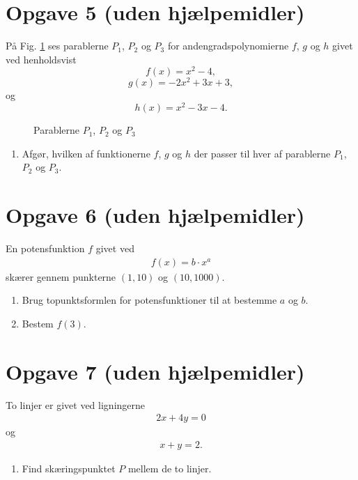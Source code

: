 \section*{Opgave 5 (uden hjælpemidler)}
På Fig. \ref{fig:polys} ses parablerne $P_1$, $P_2$ og $P_3$ for andengradspolynomierne $f$, $g$ og $h$ givet ved henholdsvist
\[
	f(x) = x^2-4,
\]
\[
	g(x) = -2x^2+3x+3,
\]
og
\[
	h(x)= x^2-3x-4.
\]
\begin{figure}[H]
\centering
	\caption{Parablerne $P_1$, $P_2$ og $P_3$}
	\label{fig:polys}
\end{figure}
\begin{enumerate}[label=\roman*)]
\item Afgør, hvilken af funktionerne $f$, $g$ og $h$ der passer til hver af parablerne $P_1$, $P_2$ og $P_3$.
\end{enumerate}

\section*{Opgave 6 (uden hjælpemidler)}
En potensfunktion $f$ givet ved
\begin{align*}
f(x) = b\cdot x^a
\end{align*} skærer gennem punkterne $(1,10)$ og $(10,1000)$.
\begin{enumerate}[label=\roman*)]
\item Brug topunktsformlen for potensfunktioner til at bestemme $a$ og $b$.
\item Bestem $f(3)$.
\end{enumerate}

\section*{Opgave 7 (uden hjælpemidler)}
To linjer er givet ved ligningerne
\begin{align*}
2x+4y = 0
\end{align*}
og 
\begin{align*}
x+y = 2.
\end{align*}
\begin{enumerate}[label=\roman*)]
\item Find skæringspunktet $P$ mellem de to linjer.
\end{enumerate}

